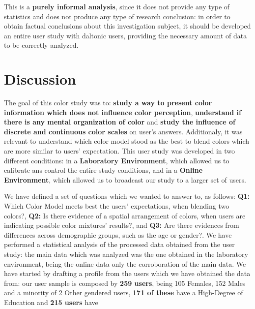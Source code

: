 %
This is a \textbf{purely informal analysis}, since it does not provide any type of statistics and does not produce any type of research conclusion: in order to obtain factual conclusions about this investigation subject, it should be developed an entire user study with daltonic users, providing the necessary amount of data to be correctly
analyzed.
%
%
\section{Discussion}
\label{sec:results_discussion}
%
The goal of this color study was to: \textbf{study a way to present color information which does not influence color perception}, \textbf{understand if there is any mental organization of color} and \textbf{study the influence of discrete and continuous color scales} on
user's answers. Additionaly, it was relevant to understand which color model stood as the best to blend colors which are more similar to users' expectation. This user study was developed in two different conditions: in a \textbf{Laboratory Environment}, which allowed us
to calibrate ans control the entire study conditions, and in a \textbf{Online Environment}, which allowed us to broadcast our study to a larger set of users. \par
%
We have defined a set of questions which we wanted to answer to, as follows:
\textbf{Q1:} Which Color Model meets best the users' expectations, when blending two colors?,
\textbf{Q2:} Is there evidence of a spatial arrangement of colors, when users are indicating possible color mixtures' results?, and
\textbf{Q3:} Are there evidences from differences across demographic groups, such as the age or gender?.
%
We have performed a statistical analysis of the processed data obtained from the user study: the main data which was analyzed was the one obtained in the laboratory environment, being the online data only the corroboration of the main data. We have started by drafting a
profile from the users which we have obtained the data from: our user sample is composed by \textbf{259 users}, being 105 Females, 152 Males and a minority of 2 Other gendered users, \textbf{171 of these} have a High-Degree of Education and \textbf{215 users} have
